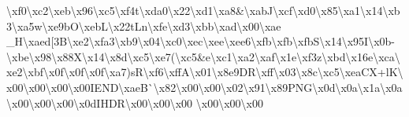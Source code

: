 \begin{DoxyCompactItemize}
\textbackslash{}xf0\textbackslash{}xc2\textbackslash{}xeb\textbackslash{}x96\textbackslash{}xc5\textbackslash{}xf4t\textbackslash{}xda0\textbackslash{}x22\textbackslash{}xd1\textbackslash{}xa8\&\textbackslash{}xab\+J\textbackslash{}xcf\textbackslash{}xd0\textbackslash{}x85\textbackslash{}xa1\textbackslash{}x14\textbackslash{}xb3\textbackslash{}xa5w\textbackslash{}xe9b\+O\textbackslash{}xeb\+L\textbackslash{}x22t\+Ln\textbackslash{}xfe\textbackslash{}xd3\textbackslash{}xbb\textbackslash{}xad\textbackslash{}x00\textbackslash{}xae \+\_\+\+H\textbackslash{}xaed\mbox{[}3\+B\textbackslash{}xe2\textbackslash{}xfa3\textbackslash{}xb9\textbackslash{}x04\textbackslash{}xc0\textbackslash{}xec\textbackslash{}xee\textbackslash{}xee6\textbackslash{}xfb\textbackslash{}xfb\textbackslash{}xfb\+S\textbackslash{}x14\textbackslash{}x95\+I\textbackslash{}x0b-\/\textbackslash{}xbe\textbackslash{}x98\textbackslash{}x88\+X\textbackslash{}x14\textbackslash{}x8d\textbackslash{}xc5\textbackslash{}xe7(\textbackslash{}xc5\&e\textbackslash{}xc1\textbackslash{}xa2\textbackslash{}xaf\textbackslash{}x1e\textbackslash{}xf3z\textbackslash{}xbd\textbackslash{}x16e\textbackslash{}xca\textbackslash{}xe2\textbackslash{}xbf\textbackslash{}x0f\textbackslash{}x0f\textbackslash{}x0f\textbackslash{}xa7)s\+R\textbackslash{}xf6\textbackslash{}xff\+A\textbackslash{}x01\textbackslash{}x8e9\+D\+R\textbackslash{}xff\textbackslash{}x03\textbackslash{}x8c\textbackslash{}xc5\textbackslash{}xea\+C\+X+l\+K\textbackslash{}x00\textbackslash{}x00\textbackslash{}x00\textbackslash{}x00\+I\+E\+N\+D\textbackslash{}xae\+B\`{}\textbackslash{}x82\textbackslash{}x00\textbackslash{}x00\textbackslash{}x02\textbackslash{}x91\textbackslash{}x89\+P\+N\+G\textbackslash{}x0d\textbackslash{}x0a\textbackslash{}x1a\textbackslash{}x0a\textbackslash{}x00\textbackslash{}x00\textbackslash{}x00\textbackslash{}x0d\+I\+H\+D\+R\textbackslash{}x00\textbackslash{}x00\textbackslash{}x00 \textbackslash{}x00\textbackslash{}x00\textbackslash{}x00 
\end{DoxyCompactItemize}
